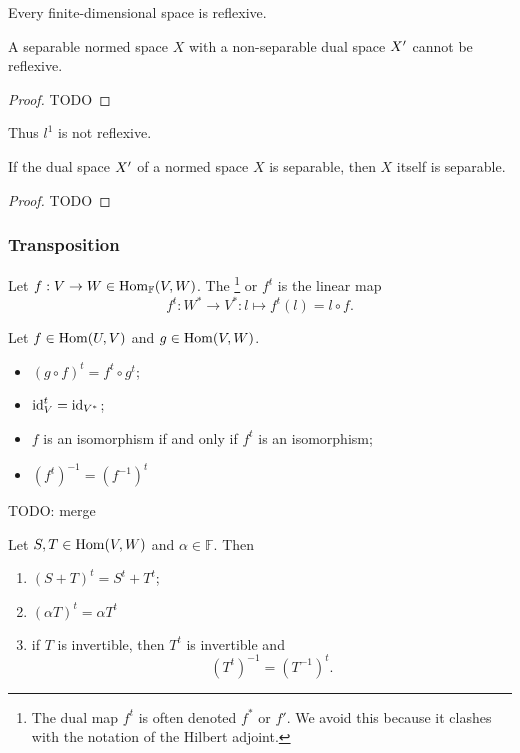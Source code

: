 \begin{lemma}
Every finite-dimensional space is reflexive.
\end{lemma}

\begin{proposition}
A separable normed space $X$ with a non-separable dual space ${X}^\prime$ cannot be reflexive. 
\end{proposition}
\begin{proof}
TODO
\end{proof}
Thus $l^1$ is not reflexive.

\begin{proposition}
If the dual space ${X}^\prime$ of a  normed space $X$ is separable, then $X$ itself is separable. 
\end{proposition}
\begin{proof}
TODO
\end{proof}

\subsubsection{Transposition}
\begin{definition}
Let $f:V\to W \in \operatorname{Hom}_{\mathbb{F}}(V,W)$. The \footnote{The dual map $f^t$ is often denoted $f^*$ or $f'$. We avoid this because it clashes with the notation of the Hilbert adjoint.} or  $f^t$ is the linear map
\[ f^t:W^* \to V^*: l\mapsto f^t(l) = l\circ f. \]
\end{definition}
\begin{lemma}
Let $f\in \operatorname{Hom}(U,V)$ and $g\in \operatorname{Hom}(V,W)$.
\begin{itemize}
\item $(g\circ f)^t = f^t\circ g^t$;
\item $\operatorname{id}^t_V = \operatorname{id}_{{V}^*}$;
\item $f$ is an isomorphism \textup{if and only if} $f^t$ is an isomorphism;
\item $(f^t)^{-1} = (f^{-1})^t$ 
\end{itemize}
\end{lemma}
TODO: merge
\begin{lemma}
Let $S,T\in\operatorname{Hom}(V,W)$ and $\alpha\in\mathbb{F}$. Then
\begin{enumerate}
\item $(S+T)^t = S^t+T^t$;
\item $(\alpha T)^t = \alpha T^t$
\item if $T$ is invertible, then $T^t$ is invertible and
\[ (T^t)^{-1} = (T^{-1})^t. \]
\end{enumerate}
\end{lemma}

